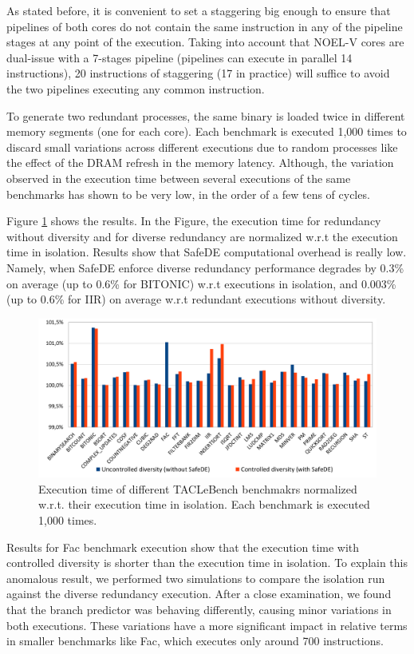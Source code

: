 As stated before, it is convenient to set a staggering big enough to ensure that pipelines of both cores do not contain the same instruction in any of the pipeline stages at any point of the execution. Taking into account that NOEL-V cores are dual-issue with a 7-stages pipeline (pipelines can execute in parallel 14 instructions), 20 instructions of staggering (17 in practice) will suffice to avoid the two pipelines executing any common instruction. 

To generate two redundant processes, the same binary is loaded twice in different memory segments (one for each core). Each benchmark is executed 1,000 times to discard small variations across different executions due to random processes like the effect of the DRAM refresh in the memory latency. Although, the variation observed in the execution time between several executions of the same benchmarks has shown to be very low, in the order of a few tens of cycles.

Figure \ref{fig:tacle_results} shows the results. In the Figure, the execution time for redundancy without diversity and for diverse redundancy are normalized w.r.t the execution time in isolation. Results show that SafeDE computational overhead is really low. Namely, when SafeDE enforce diverse redundancy performance degrades by 0.3\% on average (up to 0.6\% for BITONIC) w.r.t executions in isolation, and 0.003\% (up to 0.6\% for IIR) on average w.r.t redundant executions without diversity. 

\begin{figure}[h]
    \centering
    \includegraphics[scale=1]{img/tacle_results.png}
    \caption{Execution time of different TACLeBench benchmakrs normalized w.r.t. their execution time in isolation. Each benchmark is executed 1,000 times.}
    \label{fig:tacle_results}
\end{figure}


Results for Fac benchmark execution show that the execution time with controlled diversity is shorter than the execution time in isolation. To explain this anomalous result, we performed two simulations to compare the isolation run against the diverse redundancy execution. After a close examination, we found that the branch predictor was behaving differently, causing minor variations in both executions. These variations have a more significant impact in relative terms in smaller benchmarks like Fac, which executes only around 700 instructions. 

